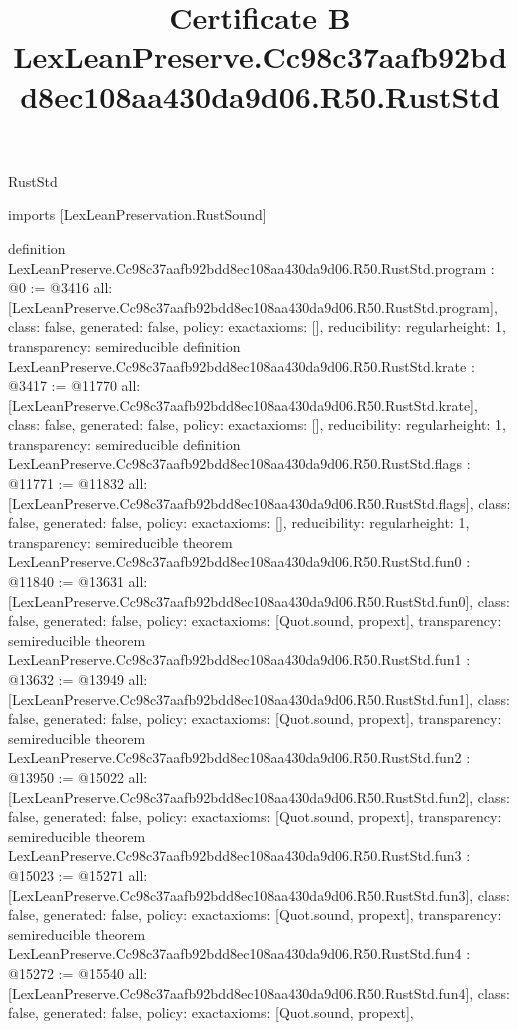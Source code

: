 \begin{lexlean}{RustStd}
\title{Certificate B LexLeanPreserve.Cc98c37aafb92bdd8ec108aa430da9d06.R50.RustStd}
\begin{coremodule}
imports [LexLeanPreservation.RustSound]

definition LexLeanPreserve.Cc98c37aafb92bdd8ec108aa430da9d06.R50.RustStd.program : @0 := @3416 {
  all: [LexLeanPreserve.Cc98c37aafb92bdd8ec108aa430da9d06.R50.RustStd.program],
  class: false,
  generated: false,
  policy: exact{axioms: []},
  reducibility: regular{height: 1},
  transparency: semireducible
}
definition LexLeanPreserve.Cc98c37aafb92bdd8ec108aa430da9d06.R50.RustStd.krate : @3417 := @11770 {
  all: [LexLeanPreserve.Cc98c37aafb92bdd8ec108aa430da9d06.R50.RustStd.krate],
  class: false,
  generated: false,
  policy: exact{axioms: []},
  reducibility: regular{height: 1},
  transparency: semireducible
}
definition LexLeanPreserve.Cc98c37aafb92bdd8ec108aa430da9d06.R50.RustStd.flags : @11771 := @11832 {
  all: [LexLeanPreserve.Cc98c37aafb92bdd8ec108aa430da9d06.R50.RustStd.flags],
  class: false,
  generated: false,
  policy: exact{axioms: []},
  reducibility: regular{height: 1},
  transparency: semireducible
}
theorem LexLeanPreserve.Cc98c37aafb92bdd8ec108aa430da9d06.R50.RustStd.fun0 : @11840 := @13631 {
  all: [LexLeanPreserve.Cc98c37aafb92bdd8ec108aa430da9d06.R50.RustStd.fun0],
  class: false,
  generated: false,
  policy: exact{axioms: [Quot.sound, propext]},
  transparency: semireducible
}
theorem LexLeanPreserve.Cc98c37aafb92bdd8ec108aa430da9d06.R50.RustStd.fun1 : @13632 := @13949 {
  all: [LexLeanPreserve.Cc98c37aafb92bdd8ec108aa430da9d06.R50.RustStd.fun1],
  class: false,
  generated: false,
  policy: exact{axioms: [Quot.sound, propext]},
  transparency: semireducible
}
theorem LexLeanPreserve.Cc98c37aafb92bdd8ec108aa430da9d06.R50.RustStd.fun2 : @13950 := @15022 {
  all: [LexLeanPreserve.Cc98c37aafb92bdd8ec108aa430da9d06.R50.RustStd.fun2],
  class: false,
  generated: false,
  policy: exact{axioms: [Quot.sound, propext]},
  transparency: semireducible
}
theorem LexLeanPreserve.Cc98c37aafb92bdd8ec108aa430da9d06.R50.RustStd.fun3 : @15023 := @15271 {
  all: [LexLeanPreserve.Cc98c37aafb92bdd8ec108aa430da9d06.R50.RustStd.fun3],
  class: false,
  generated: false,
  policy: exact{axioms: [Quot.sound, propext]},
  transparency: semireducible
}
theorem LexLeanPreserve.Cc98c37aafb92bdd8ec108aa430da9d06.R50.RustStd.fun4 : @15272 := @15540 {
  all: [LexLeanPreserve.Cc98c37aafb92bdd8ec108aa430da9d06.R50.RustStd.fun4],
  class: false,
  generated: false,
  policy: exact{axioms: [Quot.sound, propext]},
}
\end{coremodule}
\end{lexlean}
